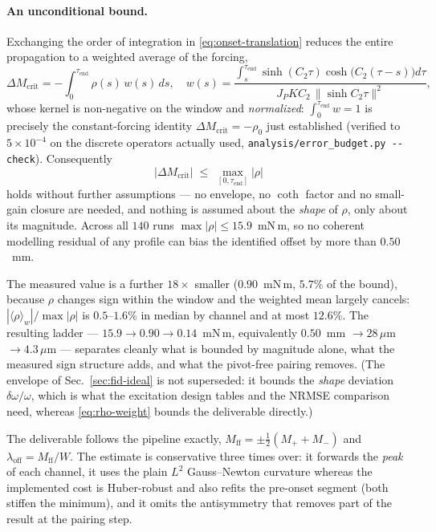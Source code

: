 \paragraph{An unconditional bound.} Exchanging the order of integration
in \eqref{eq:onset-translation} reduces the entire propagation to a
weighted average of the forcing,
\begin{equation}
  \Delta M_{\mathrm{crit}} = -\!\int_0^{\tau_{\mathrm{end}}}\!\!\!
    \rho(s)\,w(s)\,ds,
  \quad
  w(s) = \frac{\int_s^{\tau_{\mathrm{end}}}\!
               \sinh(C_2\tau)\cosh\bigl(C_2(\tau{-}s)\bigr)d\tau}
              {J_P K C_2\,\|\sinh C_2\tau\|^2},
  \label{eq:rho-weight}
\end{equation}
whose kernel is non-negative on the window and \emph{normalized}:
$\int_0^{\tau_{\mathrm{end}}} w = 1$ is precisely the constant-forcing
identity $\Delta M_{\mathrm{crit}} = -\rho_0$ just established (verified
to $5\times10^{-4}$ on the discrete operators actually used,
\texttt{analysis/error\_budget.py -{}-check}). Consequently
\begin{equation*}
  |\Delta M_{\mathrm{crit}}| \;\le\; \max_{[0,\tau_{\mathrm{end}}]}|\rho|
\end{equation*}
holds without further assumptions --- no envelope, no $\coth$ factor and
no small-gain closure are needed, and nothing is assumed about the
\emph{shape} of $\rho$, only about its magnitude. Across all $140$ runs $\max|\rho| \le 15.9$~mN\,m, so
no coherent modelling residual of any profile can bias the identified
offset by more than $0.50$~mm.

The measured value is a further $18\times$ smaller ($0.90$~mN\,m,
$5.7\%$ of the bound), because $\rho$ changes sign within the window and
the weighted mean largely cancels: $|\langle\rho\rangle_w|/\max|\rho|$
is $0.5$--$1.6\%$ in median by channel and at most $12.6\%$. The
resulting ladder --- $15.9 \to 0.90 \to 0.14$~mN\,m, equivalently
$0.50$~mm $\to 28\,\mu$m $\to 4.3\,\mu$m --- separates cleanly what is
bounded by magnitude alone, what the measured sign structure adds, and
what the pivot-free pairing removes. (The envelope of
Sec.~\ref{sec:fid-ideal} is not superseded: it bounds the \emph{shape}
deviation $\delta\omega/\omega$, which is what the excitation design
tables and the NRMSE comparison need, whereas \eqref{eq:rho-weight}
bounds the deliverable directly.)

The deliverable follows the pipeline
exactly, $M_{\mathrm{ff}} = \pm\tfrac12(M_+ + M_-)$ and
$\lambda_{\mathrm{off}} = M_{\mathrm{ff}}/W$. The estimate is
conservative three times over: it forwards the \emph{peak} of each
channel, it uses the plain $L^2$ Gauss--Newton curvature whereas the
implemented cost is Huber-robust and also refits the pre-onset segment
(both stiffen the minimum), and it omits the antisymmetry that removes
part of the result at the pairing step.

